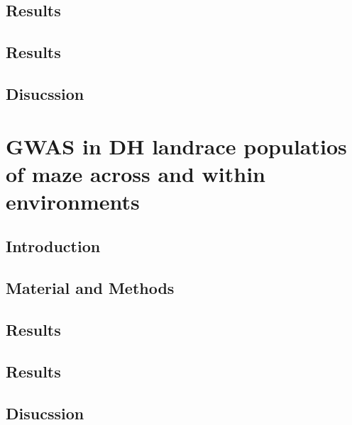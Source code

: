 \subsection{Results}
\subsection{Results}
\subsection{Disucssion}



\section{GWAS in DH landrace populatios of maze across and within environments }

\subsection{Introduction}
\subsection{Material and Methods}
\subsection{Results}
\subsection{Results}
\subsection{Disucssion}

